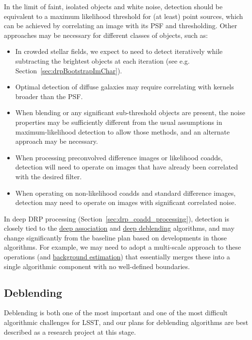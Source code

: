 In the limit of faint, isolated objects and white noise, detection should be equivalent to a maximum likelihood threshold for (at least) point sources, which can be achieved by correlating an image with its PSF and thresholding.  Other approaches may be necessary for different classes of objects, such as:
\begin{itemize}
  \item In crowded stellar fields, we expect to need to detect iteratively while subtracting the brightest objects at each iteration (see e.g. Section~\ref{sec:drpBootstrapImChar}).
  \item Optimal detection of diffuse galaxies may require correlating with kernels broader than the PSF.
  \item When blending or any significant sub-threshold objects are present, the noise properties may be sufficiently different from the usual assumptions in maximum-likelihood detection to allow those methods, and an alternate approach may be necessary.
  \item When processing preconvolved difference images or likelihood coadds, detection will need to operate on images that have already been correlated with the desired filter.
  \item When operating on non-likelihood coadds and standard difference images, detection may need to operate on images with significant correlated noise.
\end{itemize}

In deep DRP processing (Section~\ref{sec:drp_coadd_processing}), detection is closely tied to the \hyperref[drpDeepAssociate]{deep association} and \hyperref[drpDeepDeblend]{deep deblending} algorithms, and may change significantly from the baseline plan based on developments in those algorithms.  For example, we may need to adopt a multi-scale approach to these operations (and \hyperref[sec:drpCoaddBackgroundEstimation]{background estimation}) that essentially merges these into a single algorithmic component with no well-defined boundaries.


\subsection{Deblending}
\label{sec:acDeblending}

Deblending is both one of the most important and one of the most difficult algorithmic challenges for LSST, and our plans for deblending algorithms are best described as a research project at this stage.


